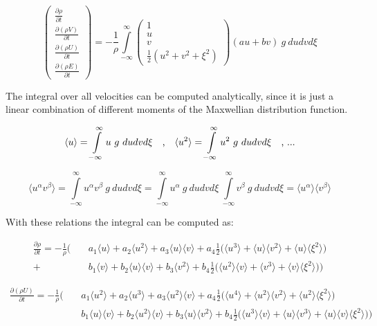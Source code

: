 \documentclass[
	pdftex,             %
	12pt,				%
	a4paper,		   	%
	english,				%
	oneside,			%
]{article}
\newcommand{\mom}[1]{\langle #1 \rangle}
\begin{document}
\begin{equation}
\begin{pmatrix}
	\frac{\partial \rho    }{\partial t} \\
	\frac{\partial (\rho V)}{\partial t} \\
	\frac{\partial (\rho U)}{\partial t} \\
	\frac{\partial (\rho E)}{\partial t}
\end{pmatrix}
 =
 -\frac{1}{\rho}
\int \limits^{\infty}_{-\infty}
\begin{pmatrix}
	1 \\
	u \\
	v \\
	\frac{1}{2} ( u^2 + v^2 + \xi^2 )
\end{pmatrix}
(a u + b v) ~g~
du dv d\xi
\end{equation}

The integral over all velocities can be computed analytically, since it is just a linear combination of different moments of the Maxwellian distribution function.

\begin{equation}
\mom{u} = \int \limits^{\infty}_{-\infty} u ~g~ du dv d\xi
~~~\textnormal{,} ~~~
\mom{u^2} = \int \limits^{\infty}_{-\infty} u^2 ~g~ du dv d\xi
~~~\textnormal{, ...}
\end{equation}

\begin{equation}
\mom{u^\alpha v^\beta}
= 
\int \limits^{\infty}_{-\infty} u^\alpha v^\beta ~g~ du dv d\xi
=
\int \limits^{\infty}_{-\infty} u^\alpha ~g~ du dv d\xi ~ 
\int \limits^{\infty}_{-\infty} v^\beta  ~g~ du dv d\xi
=
\mom{u^\alpha}\mom{v^\beta}
\end{equation}

With these relations the integral can be computed as:

\begin{eqnarray*}
\frac{\partial \rho}{\partial t}
=
-\frac{1}{\rho}
\Bigg(
 &~&a_1 \mom{u} + a_2 \mom{u^2} + a_3 \mom{u}\mom{v}
+   a_4 \frac{1}{2} \Big( \mom{u^3} + \mom{u}\mom{v^2} + \mom{u}\mom{\xi^2} \Big)
\\
+&~&b_1 \mom{v} + b_2 \mom{u}\mom{v} + b_3 \mom{v^2}
+   b_4  \frac{1}{2} \Big( \mom{u^2}\mom{v} + \mom{v^3} + \mom{v}\mom{\xi^2} \Big)
\Bigg)
\end{eqnarray*}

\begin{eqnarray*}
\frac{\partial (\rho U)}{\partial t}
=
-\frac{1}{\rho}
\Bigg(
&~&a_1 \mom{u^2} + a_2 \mom{u^3} + a_3 \mom{u^2}\mom{v}
+  a_4 \frac{1}{2} \Big( \mom{u^4} + \mom{u^2}\mom{v^2} + \mom{u^2}\mom{\xi^2} \Big)
\\
&~&b_1 \mom{u}\mom{v} + b_2 \mom{u^2}\mom{v} + b_3 \mom{u}\mom{v^2}
+  b_4 \frac{1}{2} \Big( \mom{u^3}\mom{v} + \mom{u}\mom{v^3} + \mom{u}\mom{v}\mom{\xi^2} \Big)
\Bigg)
\end{eqnarray*}
\end{document}
